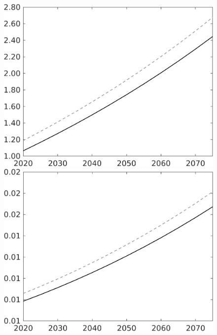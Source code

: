 \begin{figure}[h!!]
\begin{minipage}[]{0.32\textwidth}
	\end{minipage}		
	\begin{minipage}[]{0.32\textwidth}
		\includegraphics[width=1\textwidth]{../../codding_model/own_basedOnFried/optimalPol_010922_revision/figures/all_13Sept22/CompTaul_LFBAU_Reg0_C_spillover0_nsk1_xgr0_sep1_countec0_GovRev1_etaa0.79_lgd0.png}
	\end{minipage}	
\begin{minipage}[]{0.32\textwidth}
\includegraphics[width=1\textwidth]{../../codding_model/own_basedOnFried/optimalPol_010922_revision/figures/all_13Sept22/CompTaul_LFBAU_Reg0_wsf_spillover0_nsk1_xgr0_sep1_countec0_GovRev1_etaa0.79_lgd0.png}

\end{minipage}
\end{figure}
